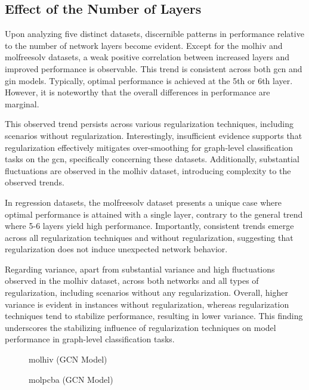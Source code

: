 \subsection{Effect of the Number of Layers}
Upon analyzing five distinct datasets, discernible patterns in performance relative to the number of network layers become evident. Except for the molhiv and molfreesolv datasets, a weak positive correlation between increased layers and improved performance is observable. This trend is consistent across both \ac{gcn} and \ac{gin} models. Typically, optimal performance is achieved at the 5th or 6th layer. However, it is noteworthy that the overall differences in performance are marginal.

This observed trend persists across various regularization techniques, including scenarios without regularization. Interestingly, insufficient evidence supports that regularization effectively mitigates over-smoothing for graph-level classification tasks on the \ac{gcn}, specifically concerning these datasets. Additionally, substantial fluctuations are observed in the molhiv dataset, introducing complexity to the observed trends.

In regression datasets, the molfreesolv dataset presents a unique case where optimal performance is attained with a single layer, contrary to the general trend where 5-6 layers yield high performance. Importantly, consistent trends emerge across all regularization techniques and without regularization, suggesting that regularization does not induce unexpected network behavior.

Regarding variance, apart from substantial variance and high fluctuations observed in the molhiv dataset, across both networks and all types of regularization, including scenarios without any regularization. Overall, higher variance is evident in instances without regularization, whereas regularization techniques tend to stabilize performance, resulting in lower variance. This finding underscores the stabilizing influence of regularization techniques on model performance in graph-level classification tasks.

\begin{figure}
    \centering
    \caption{molhiv (GCN Model)}
    \label{fig:gcn-molfreesolv}
\end{figure}

\begin{figure}
    \centering
    \caption{molpcba (GCN Model)}
    \label{fig:gcn-molfreesolv}
\end{figure}


